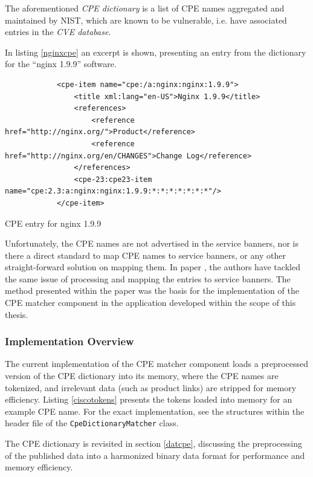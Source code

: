 \documentclass[a4paper,12pt]{article}
\begin{document}
	The aforementioned \textit{CPE dictionary} is a list of CPE names aggregated and maintained by NIST, which are known to be vulnerable, i.e. have associated entries in the \textit{CVE database}.
	
	In listing \ref{nginxcpe} an excerpt is shown, presenting an entry from the dictionary for the ``nginx 1.9.9'' software.
	
	\begin{listing}[H]
		\begin{verbatim}
			<cpe-item name="cpe:/a:nginx:nginx:1.9.9">
				<title xml:lang="en-US">Nginx 1.9.9</title>
				<references>
					<reference href="http://nginx.org/">Product</reference>
					<reference href="http://nginx.org/en/CHANGES">Change Log</reference>
				</references>
				<cpe-23:cpe23-item name="cpe:2.3:a:nginx:nginx:1.9.9:*:*:*:*:*:*:*"/>
			</cpe-item>
		\end{verbatim}
		\caption{CPE entry for nginx 1.9.9}
		\label{nginxcpe}
	\end{listing}
	
	Unfortunately, the CPE names are not advertised in the service banners, nor is there a direct standard to map CPE names to service banners, or any other straight-forward solution on mapping them. In paper \cite{shovat15}, the authors have tackled the same issue of processing and mapping the entries to service banners. The method presented within the paper was the basis for the implementation of the CPE matcher component in the application developed within the scope of this thesis.
	
\subsubsection{Implementation Overview}
 
	
	The current implementation of the CPE matcher component loads a preprocessed version of the CPE dictionary into its memory, where the CPE names are tokenized, and irrelevant data (such as product links) are stripped for memory efficiency. Listing \ref{ciscotokens} presents the tokens loaded into memory for an example CPE name. For the exact implementation, see the structures within the header file of the \texttt{CpeDictionaryMatcher} class.
	
	The CPE dictionary is revisited in section \ref{datcpe}, discussing the preprocessing of the published data into a harmonized binary data format for performance and memory efficiency.
	
\end{document}
